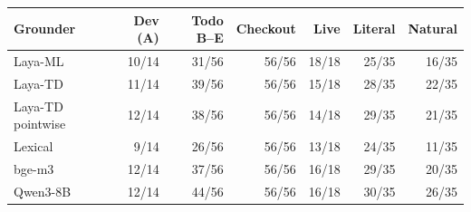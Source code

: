 \begin{tabular}{lrrrrrr}
\toprule
Grounder & Dev (A) & Todo B--E & Checkout & Live & Literal & Natural \\
\midrule
Laya-ML & 10/14 & 31/56 & 56/56 & 18/18 & 25/35 & 16/35 \\
Laya-TD & 11/14 & 39/56 & 56/56 & 15/18 & 28/35 & 22/35 \\
Laya-TD pointwise & 12/14 & 38/56 & 56/56 & 14/18 & 29/35 & 21/35 \\
Lexical & 9/14 & 26/56 & 56/56 & 13/18 & 24/35 & 11/35 \\
bge-m3 & 12/14 & 37/56 & 56/56 & 16/18 & 29/35 & 20/35 \\
Qwen3-8B & 12/14 & 44/56 & 56/56 & 16/18 & 30/35 & 26/35 \\
\bottomrule
\end{tabular}
